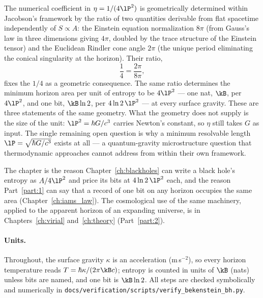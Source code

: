 The numerical coefficient in $\eta=1/(4\lP^2)$ is geometrically determined within Jacobson's framework by the ratio of two quantities derivable from
flat spacetime independently of $S\propto A$: the Einstein equation normalization $8\pi$ (from Gauss's law in three dimensions giving $4\pi$, doubled
by the trace structure of the Einstein tensor) and the Euclidean Rindler cone angle $2\pi$ (the unique period eliminating the conical singularity at
the horizon). Their ratio,
\begin{equation}
\frac14=\frac{2\pi}{8\pi},
\end{equation}
fixes the $1/4$ as a geometric consequence. The same ratio determines the minimum horizon area per unit of entropy to be $4\lP^2$ --- one nat,
$\kB$, per $4\lP^2$, and one bit, $\kB\ln2$, per $4\ln2\,\lP^2$ --- at every surface gravity. These are three statements of the same geometry. What
the geometry does not supply is the size of the unit: $\lP^2=\hbar G/c^3$ carries Newton's constant, so $\eta$ still takes $G$ as input. The single
remaining open question is why a minimum resolvable length $\lP=\sqrt{\hbar G/c^3}$ exists at all --- a quantum-gravity microstructure question that
thermodynamic approaches cannot address from within their own framework.

The chapter is the reason Chapter~\ref{ch:blackholes} can write a black hole's entropy as $A/4\lP^2$ and price its bits at $4\ln2\,\lP^2$ each, and the
reason Part~\ref{part:1} can say that a record of one bit on any horizon occupies the same area (Chapter~\ref{ch:iams_law}). The cosmological use of the
same machinery, applied to the apparent horizon of an expanding universe, is in Chapters~\ref{ch:virial} and~\ref{ch:theory} (Part~\ref{part:2}).

\paragraph{Units.} Throughout, the surface gravity $\kappa$ is an acceleration (m\,s$^{-2}$), so every horizon temperature reads $T=\hbar\kappa/(2\pi\kB c)$;
entropy is counted in units of $\kB$ (nats) unless bits are named, and one bit is $\kB\ln2$. All steps are checked symbolically and numerically in
\texttt{docs/verification/scripts/verify\_bekenstein\_bh.py}.

